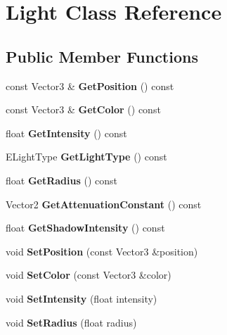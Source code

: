 \hypertarget{classLight}{}\section{Light Class Reference}
\label{classLight}
\subsection*{Public Member Functions}
\begin{DoxyCompactItemize}
\item 
\mbox{\label{classLight_a5183e96f3b976edc679456856c480d17}} 
const Vector3 \& {\bfseries Get\+Position} () const
\item 
\mbox{\label{classLight_aff03e46ab768fd30fae4e9624532351a}} 
const Vector3 \& {\bfseries Get\+Color} () const
\item 
\mbox{\label{classLight_a3df6df8d3503e59227f626380b4d7a29}} 
float {\bfseries Get\+Intensity} () const
\item 
\mbox{\label{classLight_ad825d936b6213b8cf49a6a2bd9516b1a}} 
E\+Light\+Type {\bfseries Get\+Light\+Type} () const
\item 
\mbox{\label{classLight_acba7192fae5c7f97f41c12fb9773145c}} 
float {\bfseries Get\+Radius} () const
\item 
\mbox{\label{classLight_abf1be47f811217845e2381fd01e01c6d}} 
Vector2 {\bfseries Get\+Attenuation\+Constant} () const
\item 
\mbox{\label{classLight_af2cd275417fec333fecadb28180805ca}} 
float {\bfseries Get\+Shadow\+Intensity} () const
\item 
\mbox{\label{classLight_a9163be3eb36a2bee3d80664afff48a6a}} 
void {\bfseries Set\+Position} (const Vector3 \&position)
\item 
\mbox{\label{classLight_a1930e36520d82d4d82779c66bba28734}} 
void {\bfseries Set\+Color} (const Vector3 \&color)
\item 
\mbox{\label{classLight_a13d3927b9123987a5151f63d5d4c3fc4}} 
void {\bfseries Set\+Intensity} (float intensity)
\item 
\mbox{\label{classLight_a304fff5378538a07af88b77a0fee81fe}} 
void {\bfseries Set\+Radius} (float radius)
\end{DoxyCompactItemize}
